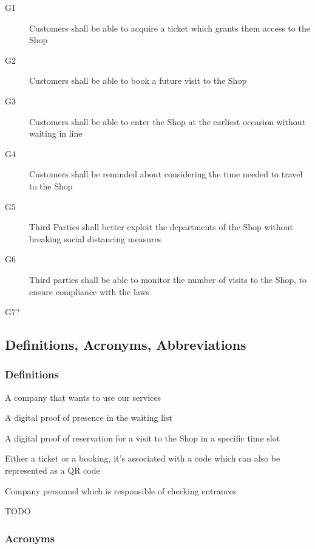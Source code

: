 \begin{description}
    \item [G1] Customers shall be able to acquire a ticket which grants them access to the Shop
    \item [G2]  Customers shall be able to book a future visit to the Shop
    \item [G3]  Customers shall be able to enter the Shop at the earliest occasion without waiting in line
    \item [G4]  Customers shall be reminded about considering the time needed to travel to the Shop
    \item [G5]  Third Parties shall better exploit the departments of the Shop without breaking social distancing measures
    \item [G6]  Third parties shall be able to monitor the number of visits to the Shop, to ensure compliance with the laws
    \item [G7?] 

\end{description}

\subsection{Definitions, Acronyms, Abbreviations}
\subsubsection{Definitions}

\begin{description}
    \item [Third party company] A company that wants to use our services
    \item [Ticket] A digital proof of presence in the waiting list
    \item [Booking] A digital proof of reservation for a visit to the Shop in a specific time slot
    \item [Token] Either a ticket or a booking, it's associated with a code which can also be represented as a QR code
    \item [Staff] Company personnel which is responsible of checking entrances
          {\todo
    \item \huge TODO
          }
\end{description}
\subsubsection{Acronyms}

